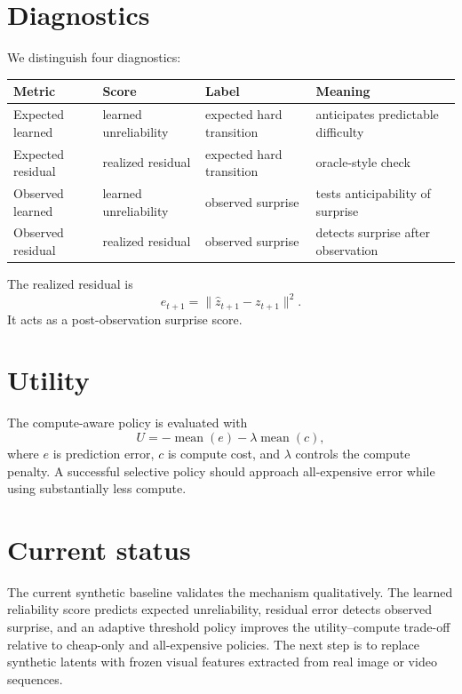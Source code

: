 \documentclass[10pt]{article}
\begin{document}
\section{Diagnostics}
We distinguish four diagnostics:
\begin{center}
\begin{tabular}{llll}
\toprule
Metric & Score & Label & Meaning \\
\midrule
Expected learned & learned unreliability & expected hard transition & anticipates predictable difficulty \\
Expected residual & realized residual & expected hard transition & oracle-style check \\
Observed learned & learned unreliability & observed surprise & tests anticipability of surprise \\
Observed residual & realized residual & observed surprise & detects surprise after observation \\
\bottomrule
\end{tabular}
\end{center}

The realized residual is
\begin{equation}
    e_{t+1} = \lVert \hat z_{t+1} - z_{t+1} \rVert^2.
\end{equation}
It acts as a post-observation surprise score.

\section{Utility}
The compute-aware policy is evaluated with
\begin{equation}
    U = -\operatorname{mean}(e) - \lambda \operatorname{mean}(c),
\end{equation}
where \(e\) is prediction error, \(c\) is compute cost, and \(\lambda\) controls the compute penalty. A successful selective policy should approach all-expensive error while using substantially less compute.

\section{Current status}
The current synthetic baseline validates the mechanism qualitatively. The learned reliability score predicts expected unreliability, residual error detects observed surprise, and an adaptive threshold policy improves the utility--compute trade-off relative to cheap-only and all-expensive policies. The next step is to replace synthetic latents with frozen visual features extracted from real image or video sequences.
\end{document}
